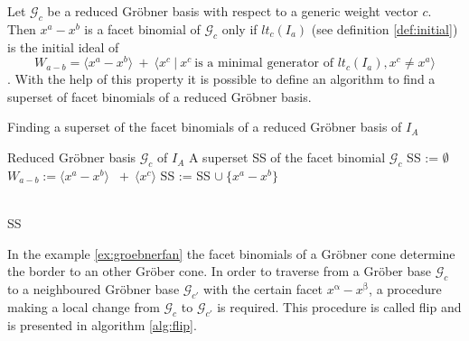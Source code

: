 Let $\mathcal{G}_{c} $ be a reduced Gröbner basis with respect to a generic weight vector $c$. Then $x^{a} - x^{b}$ is a facet binomial of $\mathcal{G}_{c}$ only if $lt_{c}(I_{a})$ (see definition \ref{def:initial}) is the initial ideal of \[W_{a - b} = \langle x^{a}-x^{b}\rangle~+~ \langle x^{c}~|~x^{c}~\textrm{is a minimal generator of~} lt_{c}(I_{a}), x^{c} \neq x^{a} \rangle \] \cite{tigers}.
With the help of this property it is possible to define an algorithm to find a superset of facet binomials of a reduced Gröbner basis.

\begin{algorithm}
\caption{Finding a superset of the facet binomials
of a reduced Gröbner basis of $I_A$ \cite{tigers}}
\label{alg:facetSS}
\begin{algorithmic}[1]

\Input
Reduced Gröbner basis $ \mathcal{G}_{c} $ of $I_A$
\Output A superset SS of the facet binomial $\mathcal{G}_{c}$
\State SS := $\emptyset$
\State $W_{a - b} := \langle x^{a}-x^{b}\rangle$
$~+~ \langle x^{c} \rangle$ 
\State SS := SS $\cup~ \{x^{a}-x^{b} \}$

\EndIf
\EndFor \\
\Return SS

\end{algorithmic}
\end{algorithm}
 

In the example \ref{ex:groebnerfan} the facet binomials of a Gröbner cone determine the border to an other Gröber cone.
In order to traverse from a Gröber base $\mathcal{G}_c$ to a neighboured Gröbner base $\mathcal{G}_{c'}$ with the certain facet $x^{\upalpha}-x^{\upbeta} $, a procedure making a local change from $\mathcal{G}_c$ to $\mathcal{G}_{c'}$ is required.
This procedure is called flip and is presented in algorithm \ref{alg:flip}. 
\newpage


